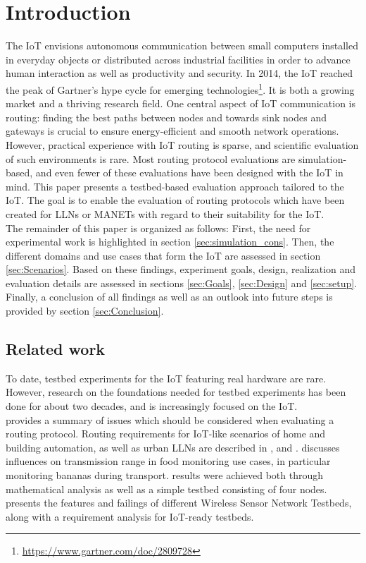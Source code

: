 \documentclass{acm_proc_article-sp}
\begin{document}
\section{Introduction}
\label{sec:Intro}
The \gls{IoT} envisions autonomous communication between small computers installed in everyday objects or distributed across industrial facilities in order to advance human interaction as well as productivity and security.
In 2014, the \gls{IoT} reached the peak of Gartner's hype cycle for emerging technologies\footnote{ \url{https://www.gartner.com/doc/2809728}}. It is both a growing market and a thriving research field.
One central aspect of IoT communication is routing: finding the best paths between nodes and towards sink nodes and gateways is crucial to ensure energy-efficient and smooth network operations. However, practical experience with IoT routing is sparse, and scientific evaluation of such environments is rare. Most routing protocol evaluations are simulation-based, and even fewer of these evaluations have been designed with the IoT in mind.
This paper presents a testbed-based evaluation approach tailored to the IoT. The goal is to enable the evaluation of routing protocols which have been created for \glspl{LLN} or \glspl{MANET} with regard to their suitability for the IoT.\\
The remainder of this paper is organized as follows:
First, the need for experimental work is highlighted in section \ref{sec:simulation_cons}. Then, the different domains and use cases that form the IoT are assessed in section \ref{sec:Scenarios}. Based on these findings, experiment goals, design, realization and evaluation details are assessed in sections \ref{sec:Goals}, \ref{sec:Design} and \ref{sec:setup}. Finally, a conclusion of all findings as well as an outlook into future steps is provided by section \ref{sec:Conclusion}.

\subsection{Related work}
\label{subsec:related_work}
To date, testbed experiments for the IoT featuring real hardware are rare. However, research on the foundations needed for testbed experiments has been done for about two decades, and is increasingly focused on the IoT.\\
\cite{RFC-2501} provides a summary of issues which should be considered when evaluating a routing protocol. Routing requirements for IoT-like scenarios of home and building automation, as well as urban \glspl{LLN} are described in \cite{RFC-5826}, \cite{RFC-5867} and \cite{RFC-5548}.
\cite{food_monitoring} discusses influences on transmission range in food monitoring use cases, in particular monitoring bananas during transport. results were achieved both through mathematical analysis as well as a simple testbed consisting of four nodes.
\cite{testbed-survey} presents the features and failings of different Wireless Sensor Network Testbeds, along with a requirement analysis for IoT-ready testbeds.
\end{document}
